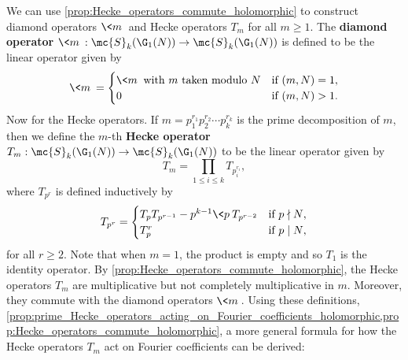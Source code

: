     We can use \cref{prop:Hecke_operators_commute_holomorphic} to construct diamond operators $\<m\>$ and Hecke operators $T_{m}$ for all $m \ge 1$. The \textbf{diamond operator} $\<m\>:\mc{S}_{k}(\G_{1}(N)) \to \mc{S}_{k}(\G_{1}(N))$ is defined to be the linear operator given by
    \[
      \<m\> = \begin{cases} \<m\> \text{ with $m$ taken modulo $N$} & \text{if $(m,N) = 1$}, \\ 0 & \text{if $(m,N) > 1$}. \end{cases}
    \]
    Now for the Hecke operators. If $m = p_{1}^{r_{1}}p_{2}^{r_{2}} \cdots p_{k}^{r_{k}}$ is the prime decomposition of $m$, then we define the $m$-th \textbf{Hecke operator} $T_{m}:\mc{S}_{k}(\G_{1}(N)) \to \mc{S}_{k}(\G_{1}(N))$ to be the linear operator given by
    \[
      T_{m} = \prod_{1 \le i \le k}T_{p_{i}^{r_{i}}},
    \]
    where $T_{p^{r}}$ is defined inductively by
    \[
      T_{p^{r}} = \begin{cases} T_{p}T_{p^{r-1}}-p^{k-1}\<p\>T_{p^{r-2}} & \text{if $p \nmid N$}, \\ T_{p}^{r} & \text{if $p \mid N$}, \end{cases}
    \]
    for all $r \ge 2$. Note that when $m = 1$, the product is empty and so $T_{1}$ is the identity operator. By \cref{prop:Hecke_operators_commute_holomorphic}, the Hecke operators $T_{m}$ are multiplicative but not completely multiplicative in $m$. Moreover, they commute with the diamond operators $\<m\>$. Using these definitions, \cref{prop:prime_Hecke_operators_acting_on_Fourier_coefficients_holomorphic,prop:Hecke_operators_commute_holomorphic}, a more general formula for how the Hecke operators $T_{m}$ act on Fourier coefficients can be derived:

